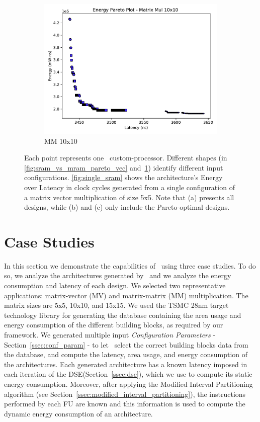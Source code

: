 \begin{figure}[ht]
\begin{subfigure}{.33\textwidth}
  \includegraphics[width=\textwidth]{graphs/EnergyParetoMatrixMul10.pdf}
  \caption{MM 10x10}
  \label{fig:sram_vs_mram_pareto_mul}
\end{subfigure}
    \caption{\small Each point represents one \frameworkname~custom-processor. Different shapes (in \ref{fig:sram_vs_mram_pareto_vec} and~\ref{fig:sram_vs_mram_pareto_mul}) identify different input configurations. \ref{fig:single_sram} shows the architecture's Energy over Latency in clock cycles generated from a single configuration of a matrix vector multiplication of size 5x5. Note that (a) presents all designs, while (b) and (c) only include the Pareto-optimal designs.}
\label{fig:case_studies_1}
\end{figure}
\section{Case Studies}
\label{sec:case_studies}
In this section we demonstrate the capabilities of \frameworkname~using three case studies. To do so, we analyze the architectures generated by \frameworkname~and we analyze the energy consumption and latency of each design.
We selected two representative applications: matrix-vector (MV) and matrix-matrix (MM) multiplication. The matrix sizes are 5x5, 10x10, and 15x15. We used the TSMC 28nm target technology library for generating the database containing the area usage and energy consumption of the different building blocks, as required by our framework.
We generated multiple input \textit{Configuration Parameters} - Section~\ref{ssec:conf_param} - to let \frameworkname~select the correct building blocks data from the database, and compute the latency, area usage, and energy consumption of the architectures. Each generated architecture has a known latency imposed in each iteration of the DSE(Section~\ref{ssec:dse}), which we use to compute its static energy consumption. Moreover, after applying the Modified Interval Partitioning algorithm (see Section~\ref{ssec:modified_interval_partitioning}), the instructions performed by each FU are known and this information is used to compute the dynamic energy consumption of an architecture.

